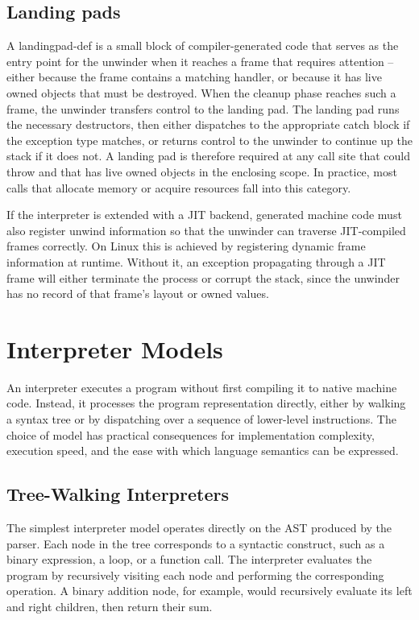 \subsection{Landing pads}

A \gls{landingpad-def} is a small block of compiler-generated code that serves as the entry point for the unwinder when it reaches a frame that requires attention -- either because the frame contains a matching handler, or because it has live owned objects that must be destroyed. When the cleanup phase reaches such a frame, the unwinder transfers control to the landing pad. The landing pad runs the necessary destructors, then either dispatches to the appropriate catch block if the exception type matches, or returns control to the unwinder to continue up the stack if it does not. A landing pad is therefore required at any call site that could throw and that has live owned objects in the enclosing scope. In practice, most calls that allocate memory or acquire resources fall into this category\cite{itanium-abi-eh, llvm-eh}.

If the interpreter is extended with a \ac{JIT} backend, generated machine code must also register unwind information so that the unwinder can traverse JIT-compiled frames correctly. On Linux this is achieved by registering dynamic frame information at runtime. Without it, an exception propagating through a JIT frame will either terminate the process or corrupt the stack, since the unwinder has no record of that frame's layout or owned values\cite{llvm-jitlink}.

\section{Interpreter Models}

An interpreter executes a program without first compiling it to native machine code. Instead, it processes the program representation directly, either by walking a syntax tree or by dispatching over a sequence of lower-level instructions. The choice of model has practical consequences for implementation complexity, execution speed, and the ease with which language semantics can be expressed.

\subsection{Tree-Walking Interpreters}

The simplest interpreter model operates directly on the \ac{AST} produced by the parser. Each node in the tree corresponds to a syntactic construct, such as a binary expression, a loop, or a function call. The interpreter evaluates the program by recursively visiting each node and performing the corresponding operation. A binary addition node, for example, would recursively evaluate its left and right children, then return their sum.

